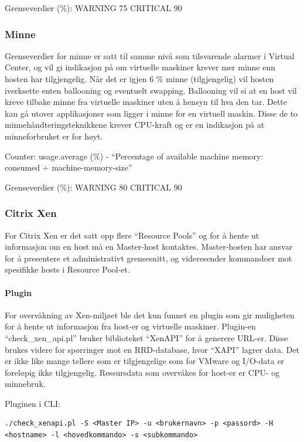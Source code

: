 Grenseverdier (\%): WARNING 75 CRITICAL 90

\subsubsection*{Minne}
Grenseverdier for minne er satt til samme nivå som tilsvarende alarmer i Virtual Center, og vil gi indikasjon på om virtuelle maskiner krever mer minne enn hosten har tilgjengelig. Når det er igjen 6 \% minne (tilgjengelig) vil hosten iverksette enten ballooning og eventuelt swapping. Ballooning vil si at en host vil kreve tilbake minne fra virtuelle maskiner uten å hensyn til hva den tar. Dette kan gå utover applikasjoner som ligger i minne for en virtuell maskin. Disse de to minnehåndteringsteknikkene krever CPU-kraft og er en indikasjon på at minneforbruket er for høyt.

Counter: usage.average (\%) - ``Percentage of available machine memory: consumed ÷ machine-memory-size''

Grenseverdier (\%): WARNING 80 CRITICAL 90

\subsubsection{Citrix Xen}
For Citrix Xen er det satt opp flere ``Resource Pools'' og for å hente ut informasjon om en host må en Master-host kontaktes. Master-hosten har ansvar for å presentere et administrativt grensesnitt, og videresender kommandoer mot spesifikke hosts i Resource Pool-et.

\paragraph{Plugin}
For overvåkning av Xen-miljøet ble det kun funnet en plugin som gir muligheten for å hente ut informasjon fra host-er og virtuelle maskiner. Plugin-en ``check\_xen\_api.pl'' bruker biblioteket ``XenAPI'' for å generere URL-er. Disse brukes videre for spørringer mot en RRD-database, hvor ``XAPI'' lagrer data\cite{xenwiki}. Det er ikke like mange tellere som er tilgjengelige som for VMware og I/O-data er foreløpig ikke tilgjengelig. Ressursdata som overvåkes for host-er er CPU- og minnebruk.

Pluginen i CLI:
\begin{lstlisting}[style=example]
./check_xenapi.pl -S <Master IP> -u <brukernavn> -p <passord> -H <hostname> -l <hovedkommando> -s <subkommando>
\end{lstlisting}

